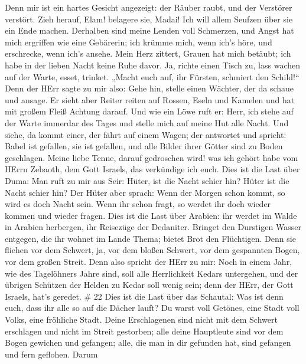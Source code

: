  Denn mir ist ein hartes Gesicht angezeigt: der Räuber
raubt, und der Verstörer verstört. Zieh herauf, Elam! belagere sie,
Madai! Ich will allem Seufzen über sie ein Ende machen. 
Derhalben sind meine Lenden voll Schmerzen, und Angst hat mich ergriffen
wie eine Gebärerin; ich krümme mich, wenn ich's höre, und erschrecke,
wenn ich's ansehe.  Mein Herz zittert, Grauen hat mich
betäubt; ich habe in der lieben Nacht keine Ruhe davor.  Ja,
richte einen Tisch zu, lass wachen auf der Warte, esset, trinket. „Macht
euch auf, ihr Fürsten, schmiert den Schild!{}``  Denn der
HErr sagte zu mir also: Gehe hin, stelle einen Wächter, der da schaue
und ansage.  Er sieht aber Reiter reiten auf Rossen, Eseln
und Kamelen und hat mit großem Fleiß Achtung darauf.  Und
wie ein Löwe ruft er: Herr, ich stehe auf der Warte immerdar des Tages
und stelle mich auf meine Hut alle Nacht.  Und siehe, da
kommt einer, der fährt auf einem Wagen; der antwortet und spricht: Babel
ist gefallen, sie ist gefallen, und alle Bilder ihrer Götter sind zu
Boden geschlagen.  Meine liebe Tenne, darauf gedroschen
wird! was ich gehört habe vom HErrn Zebaoth, dem Gott Israels, das
verkündige ich euch.  Dies ist die Last über Duma: Man ruft
zu mir aus Seir: Hüter, ist die Nacht schier hin? Hüter ist die Nacht
schier hin?  Der Hüter aber sprach: Wenn der Morgen schon
kommt, so wird es doch Nacht sein. Wenn ihr schon fragt, so werdet ihr
doch wieder kommen und wieder fragen.  Dies ist die Last
über Arabien: ihr werdet im Walde in Arabien herbergen, ihr Reisezüge
der Dedaniter.  Bringet den Durstigen Wasser entgegen, die
ihr wohnet im Lande Thema; bietet Brot den Flüchtigen. 
Denn sie fliehen vor dem Schwert, ja, vor dem bloßen Schwert, vor dem
gespannten Bogen, vor dem großen Streit.  Denn also spricht
der HErr zu mir: Noch in einem Jahr, wie des Tagelöhners Jahre sind,
soll alle Herrlichkeit Kedars untergehen,  und der übrigen
Schützen der Helden zu Kedar soll wenig sein; denn der HErr, der Gott
Israels, hat's geredet. \# 22  Dies ist die Last über das
Schautal: Was ist denn euch, dass ihr alle so auf die Dächer lauft?
 Du warst voll Getönes, eine Stadt voll Volks, eine
fröhliche Stadt. Deine Erschlagenen sind nicht mit dem Schwert
erschlagen und nicht im Streit gestorben;  alle deine
Hauptleute sind vor dem Bogen gewichen und gefangen; alle, die man in
dir gefunden hat, sind gefangen und fern geflohen.  Darum
